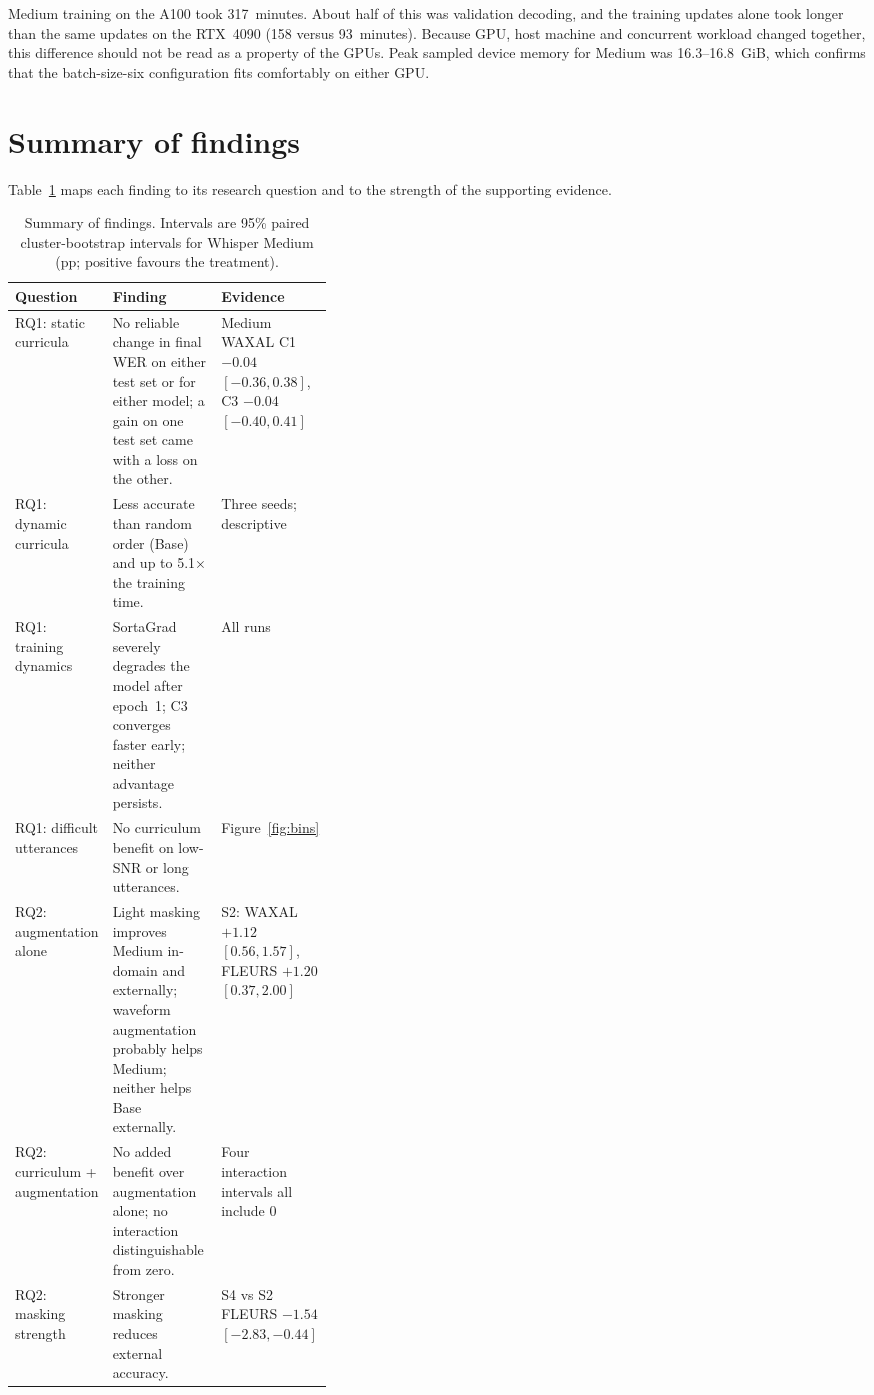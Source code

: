\documentclass[12pt,a4paper]{report}
\begin{document}
Medium training on the A100 took 317~minutes. About half of this was
validation decoding, and the training updates alone took longer than the same
updates on the RTX~4090 (158 versus 93~minutes). Because GPU, host machine and
concurrent workload changed together, this difference should not be read as
a property of the GPUs. Peak sampled device memory for Medium was
16.3--16.8~GiB, which confirms that the batch-size-six configuration fits
comfortably on either GPU.

\section{Summary of findings}
\label{sec:summary}

Table~\ref{tab:summary} maps each finding to its research question and to the
strength of the supporting evidence.

\begin{table}[htbp]\centering\small
\caption{Summary of findings. Intervals are 95\% paired cluster-bootstrap
intervals for Whisper Medium (pp; positive favours the treatment).}
\label{tab:summary}
\begin{tabularx}{\linewidth}{@{}p{0.2\linewidth}X p{0.17\linewidth}@{}}\toprule
Question & Finding & Evidence\\\midrule
RQ1: static curricula & No reliable change in final WER on either test set or
  for either model; a gain on one test set came with a loss on the other. &
  Medium WAXAL C1 $-0.04$ $[-0.36, 0.38]$, C3 $-0.04$ $[-0.40, 0.41]$\\
RQ1: dynamic curricula & Less accurate than random order (Base) and up to
  5.1$\times$ the training time. & Three seeds; descriptive\\
RQ1: training dynamics & SortaGrad severely degrades the model after epoch~1;
  C3 converges faster early; neither advantage persists. & All runs\\
RQ1: difficult utterances & No curriculum benefit on low-SNR or long
  utterances. & Figure~\ref{fig:bins}\\
RQ2: augmentation alone & Light masking improves Medium in-domain and
  externally; waveform augmentation probably helps Medium; neither helps Base
  externally. & S2: WAXAL $+1.12$ $[0.56, 1.57]$, FLEURS $+1.20$ $[0.37,
  2.00]$\\
RQ2: curriculum + augmentation & No added benefit over augmentation alone;
  no interaction distinguishable from zero. & Four interaction intervals all
  include 0\\
RQ2: masking strength & Stronger masking reduces external accuracy. & S4 vs S2
  FLEURS $-1.54$ $[-2.83, -0.44]$\\\bottomrule
\end{tabularx}
\end{table}
\end{document}
